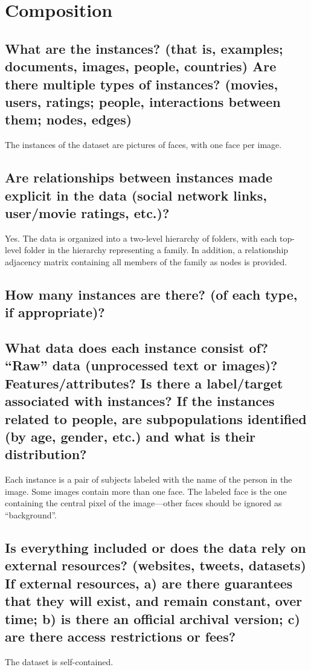 \section*{Composition}
\subsection*{What are the instances? (that is, examples; \eg documents, images, people, countries) Are there multiple types of instances? (\eg movies, users, ratings; people, interactions between them; nodes, edges)}
\noindent
{\color{red} The instances of the dataset are pictures of faces, with one face per image.} 

\subsection*{Are relationships between instances made explicit in the data (\eg social network links, user/movie ratings, etc.)?}
\noindent
{\color{red} Yes. The data is organized into a two-level hierarchy of folders, with each top-level folder in the hierarchy representing a family. In addition, a relationship adjacency matrix containing all members of the family as nodes is provided.} 

\subsection*{How many instances are there? (of each type, if appropriate)?}
\noindent

\subsection*{What data does each instance consist of? “Raw” data (\eg unprocessed text or images)? Features/attributes? Is there a label/target associated with instances? If the instances related to people, are subpopulations identified (\eg by age, gender, etc.) and what is their distribution?}
\noindent Each instance is a pair of subjects labeled with the name of the
person in the image. Some images contain more than one face.
The labeled face is the one containing the central pixel of the
image—other faces should be ignored as “background”.

\subsection*{Is everything included or does the data rely on external resources?
(\eg websites, tweets, datasets) If external resources, a) are there guarantees that they will exist, and remain constant, over time; b) is there an official archival version; c) are there access restrictions or fees?}
\noindent The dataset is self-contained.

